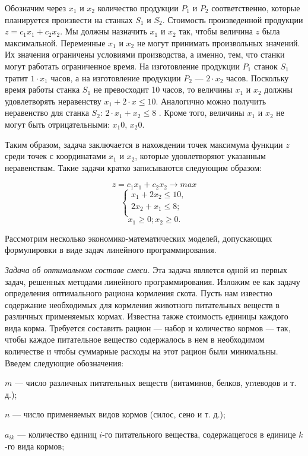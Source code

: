 Обозначим через $x_1$ и $x_2$ количество продукции $P_1$ и $P_2$ соответственно, которые планируется произвести на станках $S_1$ и $S_2$. Стоимость произведенной продукции  \( z = c_1x_1 + c_2x_2\). Мы должны назначить $x_1$ и $x_2$ так, чтобы величина $z$ была максимальной. Переменные $x_1$ и $x_2$ не могут принимать произвольных значений. Их значения ограничены условиями производства, а именно, тем, что станки могут работать ограниченное время. На изготовление продукции $P_1$ станок $S_1$  тратит $1\cdot x_1$ часов, а на изготовление продукции $P_2$  — $2\cdot x_2$ часов. Поскольку время работы станка $S_1$ не превосходит 10 часов, то величины $x_1$ и $x_2$ должны удовлетворять неравенству \(x_1 + 2\cdot x \leq 10\). Аналогично можно получить неравенство для станка $S_2$: \(2\cdot x_1 + x_2 \leq 8\) . Кроме того, величины $x_1$ и $x_2$ не могут быть отрицательными: $x_1$0, $x_2$0.

Таким образом, задача заключается в нахождении точек максимума функции $z$ среди точек с координатами $x_1$ и $x_2$, которые удовлетворяют указанным неравенствам. Такие задачи кратко записываются следующим образом:

\[z=c_1 x_1 + c_2 x_2 \rightarrow max\]
$$
\left\{
\begin{array}{ll}
x_1+2x_2\leq 10, \\
2x_2+x_1\leq 8; \\
\end{array}
\right.
$$
\[x_1\geq 0; x_2\geq 0.\]


Рассмотрим несколько экономико-математических моделей, допускающих формулировки в виде задач линейного программирования.

\textit{Задача об оптимальном составе смеси.} Эта задача является одной из первых задач, решенных методами линейного программирования. Изложим ее как задачу определения оптимального рациона кормления скота. Пусть нам известно содержание необходимых для кормления животного питательных веществ в различных применяемых кормах. Известна также стоимость единицы каждого вида корма. Требуется составить рацион — набор и количество кормов — так, чтобы каждое питательное вещество содержалось в нем в необходимом количестве и чтобы суммарные расходы на этот рацион были минимальны. Введем следующие обозначения:

$m$ — число различных питательных веществ (витаминов, белков, углеводов и т. д.);

$n$ — число применяемых видов кормов (силос, сено и т. д.);

$a_{ik}$ — количество единиц $i$-го питательного вещества, содержащегося в единице $k$-го вида кормов;

